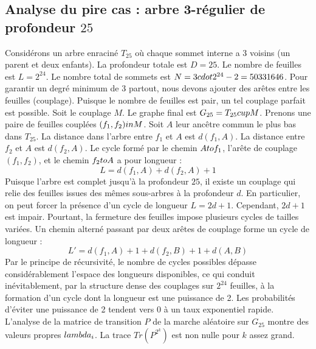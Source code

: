 \documentclass[12pt,a4paper]{article}
\begin{document}
\subsection{Analyse du pire cas : arbre 3-r\'egulier de profondeur $25$}
Consid\'erons un arbre enracin\'e $T_{25}$ o\`u chaque sommet interne a 3 voisins (un parent et deux enfants).
La profondeur totale est $D = 25$.
Le nombre de feuilles est $L = 2^{24}$.
Le nombre total de sommets est $N = 3 \\cdot 2^{24} - 2 = 50331646$.
Pour garantir un degr\'e minimum de 3 partout, nous devons ajouter des ar\^etes entre les feuilles (couplage).
Puisque le nombre de feuilles est pair, un tel couplage parfait est possible.
Soit le couplage $M$. Le graphe final est $G_{25} = T_{25} \\cup M$.
Prenons une paire de feuilles coupl\'ees $(f_1, f_2) \\in M$.
Soit $A$ leur anc\^etre commun le plus bas dans $T_{25}$.
La distance dans l'arbre entre $f_1$ et $A$ est $d(f_1, A)$.
La distance entre $f_2$ et $A$ est $d(f_2, A)$.
Le cycle form\'e par le chemin $A \\to f_1$, l'ar\^ete de couplage $(f_1, f_2)$, et le chemin $f_2 \\to A$ a pour longueur :
$$ L = d(f_1, A) + d(f_2, A) + 1 $$
Puisque l'arbre est complet jusqu'\`a la profondeur $25$, il existe un couplage qui relie des feuilles issues des m\^emes sous-arbres \`a la profondeur $d$.
En particulier, on peut forcer la pr\'esence d'un cycle de longueur $L = 2d + 1$. Cependant, $2d+1$ est impair.
Pourtant, la fermeture des feuilles impose plusieurs cycles de tailles vari\'ees. Un chemin altern\'e passant par deux ar\^etes de couplage forme un cycle de longueur :
$$ L' = d(f_1, A) + 1 + d(f_2, B) + 1 + d(A, B) $$
Par le principe de r\'ecursivit\'e, le nombre de cycles possibles d\'epasse consid\'erablement l'espace des longueurs disponibles, ce qui conduit in\'evitablement, par la structure dense des couplages sur $2^{24}$ feuilles, \`a la formation d'un cycle dont la longueur est une puissance de 2. Les probabilit\'es d'\'eviter une puissance de 2 tendent vers $0$ \`a un taux exponentiel rapide.
L'analyse de la matrice de transition $P$ de la marche al\'eatoire sur $G_{25}$ montre des valeurs propres $\\lambda_i$. La trace $Tr(P^{2^k})$ est non nulle pour $k$ assez grand.
\end{document}
